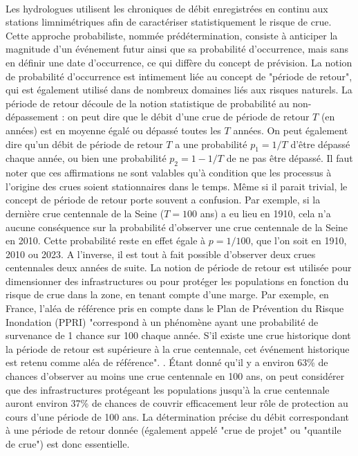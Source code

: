 \documentclass[11pt]{article}
\begin{document}
	\paragraph{} Les hydrologues utilisent les chroniques de débit enregistrées en continu aux stations limnimétriques afin de caractériser statistiquement le risque de crue. Cette approche probabiliste, nommée prédétermination, consiste à anticiper la magnitude d'un événement futur ainsi que sa probabilité d'occurrence, mais sans en définir une date d'occurrence, ce qui diffère du concept de prévision. La notion de probabilité d'occurrence est intimement liée au concept de "période de retour", qui est également utilisé dans de nombreux domaines liés aux risques naturels. La période de retour découle de la notion statistique de probabilité au non-dépassement : on peut dire que le débit d'une crue de période de retour $T$ (en années) est en moyenne égalé ou dépassé toutes les $T$ années. On peut également dire qu'un débit de période de retour $T$ a une probabilité $p_1 = 1/T$ d'être dépassé chaque année, ou bien une probabilité $p_2 = 1-1/T$ de ne pas être dépassé. Il faut noter que ces affirmations ne sont valables qu'à condition que les processus à l'origine des crues soient stationnaires dans le temps. Même si il parait trivial, le concept de période de retour porte souvent a confusion. Par exemple, si la dernière crue centennale de la Seine ($T = 100$ ans) a eu lieu en 1910, cela n'a aucune conséquence sur la probabilité d'observer une crue centennale de la Seine en 2010. Cette probabilité reste en effet égale à $p = 1/100$, que l'on soit en 1910, 2010 ou 2023. A l'inverse, il est tout à fait possible d'observer deux crues centennales deux années de suite. La notion de période de retour est utilisée pour dimensionner des infrastructures ou pour protéger les populations en fonction du risque de crue dans la zone, en tenant compte d'une marge. Par exemple, en France, l'aléa de référence pris en compte dans le Plan de Prévention du Risque Inondation (PPRI) "correspond à un phénomène ayant une probabilité de survenance de 1 chance sur 100 chaque année. S'il existe une crue historique dont la période de retour est supérieure à la crue centennale, cet événement historique est retenu comme aléa de référence". \citep{medd_site_nodate}. Étant donné qu'il y a environ 63\% de chances d'observer au moins une crue centennale en 100 ans, on peut considérer que des infrastructures protégeant les populations jusqu'à la crue centennale auront environ 37\% de chances de couvrir efficacement leur rôle de protection au cours d'une période de 100 ans. La détermination précise du débit correspondant à une période de retour donnée (également appelé "crue de projet" ou "quantile de crue") est donc essentielle.
	
\end{document}
